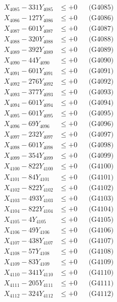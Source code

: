 \documentclass[a4paper,10pt]{article}
\begin{document}
{\begin{align}
X_{4085} - 331Y_{4085} &\leq +0 && \text{(G4085)} \\
X_{4086} - 127Y_{4086} &\leq +0 && \text{(G4086)} \\
X_{4087} - 601Y_{4087} &\leq +0 && \text{(G4087)} \\
X_{4088} - 320Y_{4088} &\leq +0 && \text{(G4088)} \\
X_{4089} - 392Y_{4089} &\leq +0 && \text{(G4089)} \\
X_{4090} - 44Y_{4090} &\leq +0 && \text{(G4090)} \\
\allowbreak
X_{4091} - 601Y_{4091} &\leq +0 && \text{(G4091)} \\
X_{4092} - 276Y_{4092} &\leq +0 && \text{(G4092)} \\
X_{4093} - 377Y_{4093} &\leq +0 && \text{(G4093)} \\
X_{4094} - 601Y_{4094} &\leq +0 && \text{(G4094)} \\
X_{4095} - 601Y_{4095} &\leq +0 && \text{(G4095)} \\
X_{4096} - 69Y_{4096} &\leq +0 && \text{(G4096)} \\
X_{4097} - 232Y_{4097} &\leq +0 && \text{(G4097)} \\
X_{4098} - 601Y_{4098} &\leq +0 && \text{(G4098)} \\
X_{4099} - 354Y_{4099} &\leq +0 && \text{(G4099)} \\
X_{4100} - 822Y_{4100} &\leq +0 && \text{(G4100)} \\
\allowbreak
X_{4101} - 84Y_{4101} &\leq +0 && \text{(G4101)} \\
X_{4102} - 822Y_{4102} &\leq +0 && \text{(G4102)} \\
X_{4103} - 493Y_{4103} &\leq +0 && \text{(G4103)} \\
X_{4104} - 822Y_{4104} &\leq +0 && \text{(G4104)} \\
X_{4105} - 4Y_{4105} &\leq +0 && \text{(G4105)} \\
X_{4106} - 49Y_{4106} &\leq +0 && \text{(G4106)} \\
X_{4107} - 438Y_{4107} &\leq +0 && \text{(G4107)} \\
X_{4108} - 57Y_{4108} &\leq +0 && \text{(G4108)} \\
X_{4109} - 83Y_{4109} &\leq +0 && \text{(G4109)} \\
X_{4110} - 341Y_{4110} &\leq +0 && \text{(G4110)} \\
\allowbreak
X_{4111} - 205Y_{4111} &\leq +0 && \text{(G4111)} \\
X_{4112} - 324Y_{4112} &\leq +0 && \text{(G4112)} \\

\end{align}}
\end{document}

